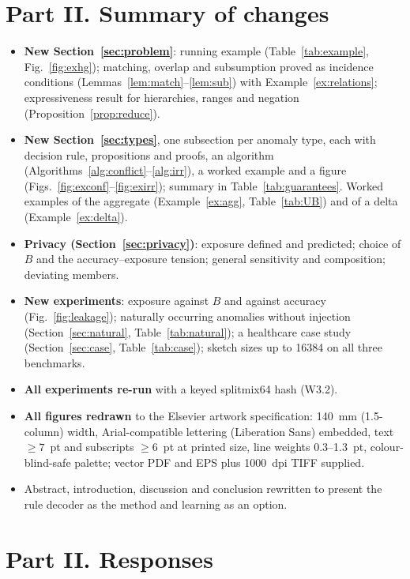 \documentclass[11pt,a4paper]{article}
\begin{document}
\section*{Part II. Summary of changes}
\begin{itemize}
\item \textbf{New Section~\ref{sec:problem}}: running example (Table~\ref{tab:example}, Fig.~\ref{fig:exhg}); matching, overlap and subsumption proved as incidence conditions (Lemmas~\ref{lem:match}--\ref{lem:sub}) with Example~\ref{ex:relations}; expressiveness result for hierarchies, ranges and negation (Proposition~\ref{prop:reduce}).
\item \textbf{New Section~\ref{sec:types}}, one subsection per anomaly type, each with decision rule, propositions and proofs, an algorithm (Algorithms~\ref{alg:conflict}--\ref{alg:irr}), a worked example and a figure (Figs.~\ref{fig:exconf}--\ref{fig:exirr}); summary in Table~\ref{tab:guarantees}. Worked examples of the aggregate (Example~\ref{ex:agg}, Table~\ref{tab:UB}) and of a delta (Example~\ref{ex:delta}).
\item \textbf{Privacy (Section~\ref{sec:privacy})}: exposure defined and predicted; choice of $B$ and the accuracy--exposure tension; general sensitivity and composition; deviating members.
\item \textbf{New experiments}: exposure against $B$ and against accuracy (Fig.~\ref{fig:leakage}); naturally occurring anomalies without injection (Section~\ref{sec:natural}, Table~\ref{tab:natural}); a healthcare case study (Section~\ref{sec:case}, Table~\ref{tab:case}); sketch sizes up to 16384 on all three benchmarks.
\item \textbf{All experiments re-run} with a keyed splitmix64 hash (W3.2).
\item \textbf{All figures redrawn} to the Elsevier artwork specification: 140~mm (1.5-column) width, Arial-compatible lettering (Liberation Sans) embedded, text $\ge7$~pt and subscripts $\ge6$~pt at printed size, line weights 0.3--1.3~pt, colour-blind-safe palette; vector PDF and EPS plus 1000~dpi TIFF supplied.
\item Abstract, introduction, discussion and conclusion rewritten to present the rule decoder as the method and learning as an option.
\end{itemize}

\section*{Part II. Responses}
\end{document}
